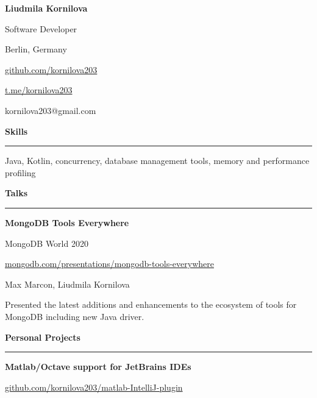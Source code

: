 \documentclass[9pt]{article}
\begin{document}
\begin{multicols}{2}

\noindent
\vspace{3em}
\noindent

{\huge{\textbf{Liudmila Kornilova}}}

Software Developer

Berlin, Germany

\vspace{1em}

\href{https://github.com/kornilova203}{github.com/kornilova203}

\href{https://t.me/kornilova203}{t.me/kornilova203}

kornilova203@gmail.com

\vspace{5em}

{\textbf{Skills}}
\vspace{0.5em}
\hrule
\vspace{1em}

Java, Kotlin, concurrency, database management tools, memory and performance profiling

\vspace{2em}
{\textbf{Talks}}
\vspace{0.5em}
\hrule
\vspace{1em}

{\textbf{MongoDB Tools Everywhere}}

\color{gray} MongoDB World 2020 \color{black}

\href{https://www.mongodb.com/presentations/mongodb-tools-everywhere}{mongodb.com/presentations/mongodb-tools-everywhere}

\vspace{0.3em}

Max Marcon, Liudmila Kornilova

\vspace{0.3em}

Presented the latest additions and enhancements to the ecosystem of tools for MongoDB including new Java driver.

\vspace{2em}
{\textbf{Personal Projects}}
\vspace{0.5em}
\hrule
\vspace{1em}

{\textbf{Matlab/Octave support for JetBrains IDEs}}

\href{https://github.com/kornilova203/matlab-IntelliJ-plugin}{github.com/kornilova203/matlab-IntelliJ-plugin}


\end{multicols}
\end{document}
